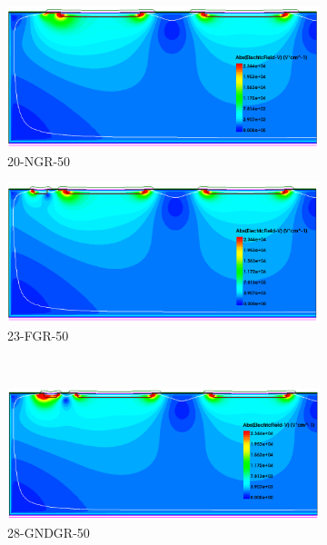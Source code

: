 \begin{figure}[htbp]
  \centering
  \begin{subfigure}[b]{0.5\textwidth}
    \includegraphics[width=\textwidth]{figures/ActiveEdge/Efield_20_NGR.png}
    \caption{20-NGR-50}
  \end{subfigure}\hfill
  \begin{subfigure}[b]{0.5\textwidth}
    \includegraphics[width=\textwidth]{figures/ActiveEdge/Efield_23_FGR.png}
    \caption{23-FGR-50}
  \end{subfigure} \\
  \begin{subfigure}[b]{0.5\textwidth}
    \includegraphics[width=\textwidth]{figures/ActiveEdge/Efield_28_GNDGR.png}
    \caption{28-GNDGR-50}
  \end{subfigure}\hfill
  \begin{subfigure}[b]{0.5\textwidth}

\end{subfigure}
\end{figure}
